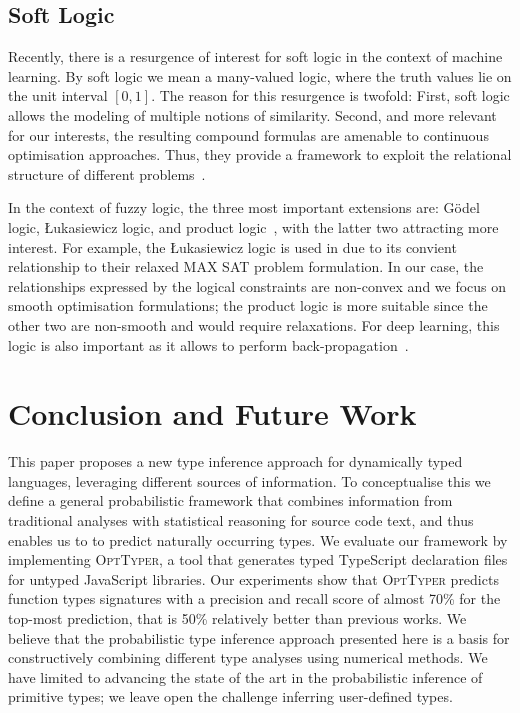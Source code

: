 \documentclass[acmsmall, review, anonymous]{acmart}\settopmatter{printfolios=true,printccs=false,printacmref=false}
\newcommand{\projectname}{\textsc{OptTyper}\xspace}
\begin{document}


\subsection{Soft Logic}\label{ssec:softlogic}
Recently, there is a resurgence of interest for soft logic in the context of machine learning. By soft logic we mean a many-valued logic, where the truth values lie on the unit interval $[0,1]$. The 
reason for this resurgence is twofold: First,
soft logic allows the modeling of multiple notions
of similarity. Second, and more relevant for our
interests, the resulting compound formulas are 
amenable to continuous optimisation approaches. Thus, they provide a framework to exploit the relational structure of different problems~\cite{kimmig12}. 

In the context of fuzzy logic, the three most
important extensions are: G{\"o}del logic, {\L}ukasiewicz logic, and product logic~\cite{hajek1998}, with the latter two attracting more interest. For example, the {\L}ukasiewicz logic is used in \citet{bach17} due 
to its convient relationship to their relaxed MAX 
SAT problem formulation. In our case, the relationships expressed by the logical constraints are non-convex and we focus on smooth optimisation
formulations; the product logic is more
suitable since the other two are non-smooth and 
would require relaxations. For 
deep learning, this logic is also important as it 
allows to perform back-propagation~\cite{evans18}.


\section{Conclusion and Future Work}\label{sec:conclusion}
This paper proposes a new type inference approach for
dynamically typed languages, leveraging different sources
of information.
%
To conceptualise this we define a
general probabilistic framework that combines
information from traditional analyses with statistical reasoning
for source code text, and thus enables us to to predict naturally occurring
types.
%
We evaluate our framework by implementing \projectname{}, a tool that
generates typed TypeScript declaration files for untyped JavaScript
libraries.
%
Our experiments show that \projectname{} predicts function types
signatures with a precision and recall score of almost 70\% for the top-most
prediction, that is 50\% relatively better than previous works.
We believe that the probabilistic type inference approach presented here
is a basis for constructively combining different type analyses using numerical methods.
%
We have limited to advancing the state of the art in the probabilistic inference
of primitive types; we leave open the challenge inferring user-defined types.
\end{document}

